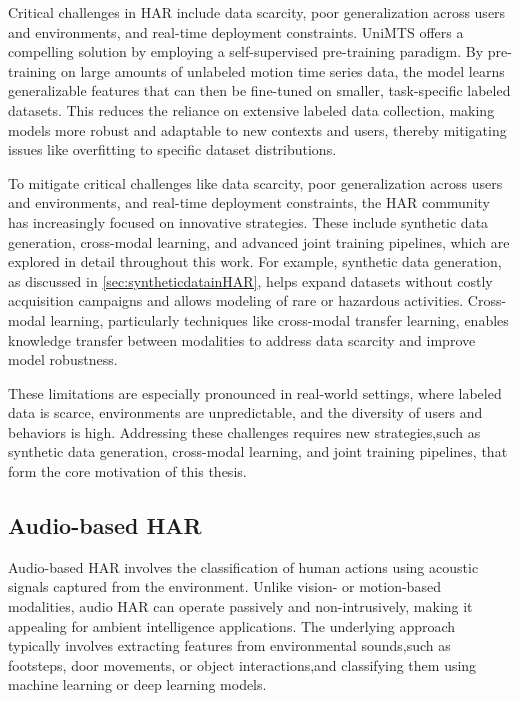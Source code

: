 Critical challenges in HAR include data scarcity, poor generalization across users and environments, and real-time deployment constraints. UniMTS \cite{zhang2024unimts} offers a compelling solution by employing a self-supervised pre-training paradigm. By pre-training on large amounts of unlabeled motion time series data, the model learns generalizable features that can then be fine-tuned on smaller, task-specific labeled datasets. This reduces the reliance on extensive labeled data collection, making models more robust and adaptable to new contexts and users, thereby mitigating issues like overfitting to specific dataset distributions.

To mitigate critical challenges like data scarcity, poor generalization across users and environments, and real-time deployment constraints, the HAR community has increasingly focused on innovative strategies. These include synthetic data generation, cross-modal learning, and advanced joint training pipelines, which are explored in detail throughout this work. For example, synthetic data generation, as discussed in \ref{sec:syntheticdatainHAR}, helps expand datasets without costly acquisition campaigns and allows modeling of rare or hazardous activities. Cross-modal learning, particularly techniques like cross-modal transfer learning, enables knowledge transfer between modalities to address data scarcity and improve model robustness.

These limitations are especially pronounced in real-world settings, where labeled data is scarce, environments are unpredictable, and the diversity of users and behaviors is high. Addressing these challenges requires new strategies,such as synthetic data generation, cross-modal learning, and joint training pipelines, that form the core motivation of this thesis.

\subsection{Audio-based HAR}

Audio-based HAR involves the classification of human actions using acoustic signals captured from the environment. Unlike vision- or motion-based modalities, audio HAR can operate passively and non-intrusively, making it appealing for ambient intelligence applications. The underlying approach typically involves extracting features from environmental sounds,such as footsteps, door movements, or object interactions,and classifying them using machine learning or deep learning models.

